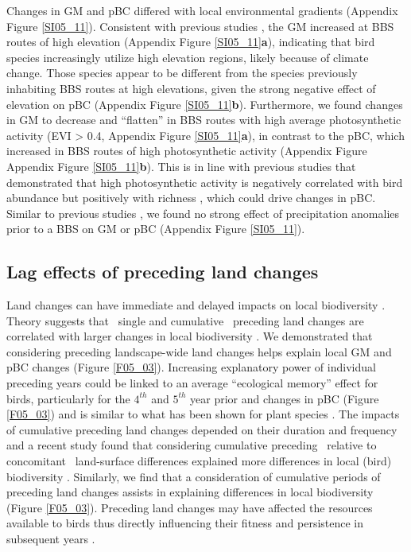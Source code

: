 Changes in GM and pBC differed with local environmental gradients (Appendix Figure \ref{SI05_11}). Consistent with previous studies \citep{Lomolino2008,Jarzyna2017}, the GM increased at BBS routes of high elevation (Appendix Figure \ref{SI05_11}\textbf{a}), indicating that bird species increasingly utilize high elevation regions, likely because of climate change. Those species appear to be different from the species previously inhabiting BBS routes at high elevations, given the strong negative effect of elevation on pBC (Appendix Figure \ref{SI05_11}\textbf{b}). Furthermore, we found changes in GM to decrease and “flatten” in BBS routes with high average photosynthetic activity (EVI > 0.4, Appendix Figure \ref{SI05_11}\textbf{a}), in contrast to the pBC, which increased in BBS routes of high photosynthetic activity (Appendix Figure Appendix Figure \ref{SI05_11}\textbf{b}). This is in line with previous studies that demonstrated that high photosynthetic activity is negatively correlated with bird abundance \citep{Barnagaud2017} but positively with richness \citep{Rowhani2008,Goetz2014}, which could drive changes in pBC. Similar to previous studies \citep{Barnagaud2017}, we found no strong effect of precipitation anomalies prior to a BBS on GM or pBC (Appendix Figure \ref{SI05_11}). 

\subsection{Lag effects of preceding land changes}
\label{C05_0402}

Land changes can have immediate and delayed impacts on local biodiversity \citep{Kuussaari2009,Hylander2013}. Theory suggests that \textendash\ single and cumulative \textendash\ preceding land changes are correlated with larger changes in local biodiversity \citep{Scheffer2001,Andersen2009,Watson2014,Ratajczak2018}. We demonstrated that considering preceding landscape-wide land changes helps explain local GM and pBC changes (Figure \ref{F05_03}). Increasing explanatory power of individual preceding years could be linked to an average “ecological memory” effect for birds, particularly for the $4^{th}$ and $5^{th}$ year prior and changes in pBC (Figure \ref{F05_03}) and is similar to what has been shown for plant species \citep{Ogle2015}. The impacts of cumulative preceding land changes depended on their duration \citep{Essl2015} and frequency \citep{Watson2014,Ratajczak2018} and a recent study found that considering cumulative preceding \textendash\ relative to concomitant \textendash\ land-surface differences explained more differences in local (bird) biodiversity \citep{Jung2018}. Similarly, we find that a consideration of cumulative periods of preceding land changes assists in explaining differences in local biodiversity (Figure \ref{F05_03}). Preceding land changes may have affected the resources available to birds thus directly influencing their fitness and persistence in subsequent years \citep{Holt2009,Harrison2011,Ogle2015}.

